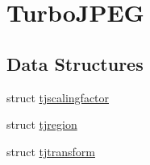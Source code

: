 \hypertarget{group___turbo_j_p_e_g}{}\section{Turbo\+J\+P\+EG}
\label{group___turbo_j_p_e_g}
\subsection*{Data Structures}
\begin{DoxyCompactItemize}
\item 
struct \hyperlink{structtjscalingfactor}{tjscalingfactor}
\item 
struct \hyperlink{structtjregion}{tjregion}
\item 
struct \hyperlink{structtjtransform}{tjtransform}
\end{DoxyCompactItemize}
